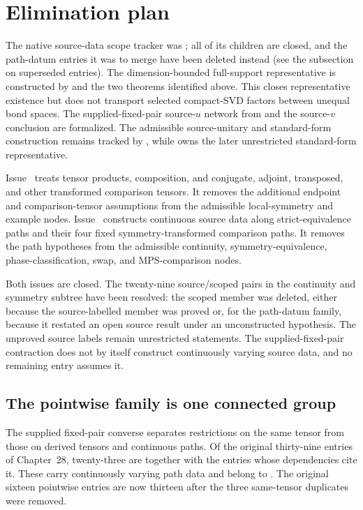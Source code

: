 \documentclass{article}
\begin{document}
\section{Elimination plan}

The native source-data scope tracker was ; all of its children
are closed, and the path-datum entries it was to merge have been deleted
instead (see the subsection on superseded entries). The
dimension-bounded full-support representative is constructed by
 and the two theorems identified above. This closes
representative existence but does not transport selected compact-SVD factors
between unequal bond spaces. The supplied-fixed-pair source-$u$ network from
 and the source-$v$ conclusion are formalized. The admissible
source-unitary and standard-form construction remains tracked by
, while  owns the later unrestricted standard-form
representative.

Issue~ treats tensor products, composition, and conjugate,
adjoint, transposed, and other transformed comparison tensors. It removes the
additional endpoint and comparison-tensor assumptions from the admissible
local-symmetry and example nodes. Issue~ constructs continuous
source data along strict-equivalence paths and their four fixed
symmetry-transformed comparison paths. It removes the path hypotheses from the
admissible continuity, symmetry-equivalence, phase-classification, swap, and
MPS-comparison nodes.

Both issues are closed. The twenty-nine source/scoped pairs in the continuity
and symmetry subtree have been resolved: the scoped member was deleted, either
because the source-labelled member was proved or, for the path-datum family,
because it restated an open source result under an unconstructed hypothesis.
The unproved source labels remain unrestricted statements. The
supplied-fixed-pair contraction does not by itself construct continuously
varying source data, and no remaining entry assumes it.

\subsection*{The pointwise family is one connected group}

The supplied fixed-pair converse separates restrictions on the same tensor
from those on derived tensors and continuous paths. Of the original thirty-nine
 entries of Chapter~28, twenty-three are
 together with the entries
whose dependencies cite it. These carry continuously varying path data and
belong to . The original sixteen pointwise entries are now
thirteen after the three same-tensor duplicates were removed.
\end{document}
